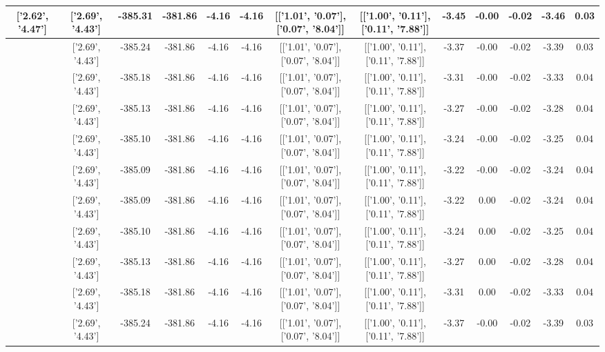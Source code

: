 \begin{table}[htbp]
\begin{adjustbox}{angle=90}
\begin{tabular}{|c|c|c|c|c|c|c|c|c|c|c|c|c|}
 ['2.62', '4.47'] & ['2.69', '4.43'] & -385.31 & -381.86 & -4.16 & -4.16 & [['1.01', '0.07'], ['0.07', '8.04']] & [['1.00', '0.11'], ['0.11', '7.88']] & -3.45 & -0.00 & -0.02 & -3.46 & 0.03\\ \hline
 ['2.63', '4.46'] & ['2.69', '4.43'] & -385.24 & -381.86 & -4.16 & -4.16 & [['1.01', '0.07'], ['0.07', '8.04']] & [['1.00', '0.11'], ['0.11', '7.88']] & -3.37 & -0.00 & -0.02 & -3.39 & 0.03\\ \hline
 ['2.65', '4.46'] & ['2.69', '4.43'] & -385.18 & -381.86 & -4.16 & -4.16 & [['1.01', '0.07'], ['0.07', '8.04']] & [['1.00', '0.11'], ['0.11', '7.88']] & -3.31 & -0.00 & -0.02 & -3.33 & 0.04\\ \hline
 ['2.66', '4.45'] & ['2.69', '4.43'] & -385.13 & -381.86 & -4.16 & -4.16 & [['1.01', '0.07'], ['0.07', '8.04']] & [['1.00', '0.11'], ['0.11', '7.88']] & -3.27 & -0.00 & -0.02 & -3.28 & 0.04\\ \hline
 ['2.67', '4.44'] & ['2.69', '4.43'] & -385.10 & -381.86 & -4.16 & -4.16 & [['1.01', '0.07'], ['0.07', '8.04']] & [['1.00', '0.11'], ['0.11', '7.88']] & -3.24 & -0.00 & -0.02 & -3.25 & 0.04\\ \hline
 ['2.68', '4.44'] & ['2.69', '4.43'] & -385.09 & -381.86 & -4.16 & -4.16 & [['1.01', '0.07'], ['0.07', '8.04']] & [['1.00', '0.11'], ['0.11', '7.88']] & -3.22 & -0.00 & -0.02 & -3.24 & 0.04\\ \hline
 ['2.70', '4.43'] & ['2.69', '4.43'] & -385.09 & -381.86 & -4.16 & -4.16 & [['1.01', '0.07'], ['0.07', '8.04']] & [['1.00', '0.11'], ['0.11', '7.88']] & -3.22 & 0.00 & -0.02 & -3.24 & 0.04\\ \hline
 ['2.71', '4.42'] & ['2.69', '4.43'] & -385.10 & -381.86 & -4.16 & -4.16 & [['1.01', '0.07'], ['0.07', '8.04']] & [['1.00', '0.11'], ['0.11', '7.88']] & -3.24 & 0.00 & -0.02 & -3.25 & 0.04\\ \hline
 ['2.72', '4.42'] & ['2.69', '4.43'] & -385.13 & -381.86 & -4.16 & -4.16 & [['1.01', '0.07'], ['0.07', '8.04']] & [['1.00', '0.11'], ['0.11', '7.88']] & -3.27 & 0.00 & -0.02 & -3.28 & 0.04\\ \hline
 ['2.73', '4.41'] & ['2.69', '4.43'] & -385.18 & -381.86 & -4.16 & -4.16 & [['1.01', '0.07'], ['0.07', '8.04']] & [['1.00', '0.11'], ['0.11', '7.88']] & -3.31 & 0.00 & -0.02 & -3.33 & 0.04\\ \hline
 ['2.75', '4.41'] & ['2.69', '4.43'] & -385.24 & -381.86 & -4.16 & -4.16 & [['1.01', '0.07'], ['0.07', '8.04']] & [['1.00', '0.11'], ['0.11', '7.88']] & -3.37 & -0.00 & -0.02 & -3.39 & 0.03\\ \hline

\end{tabular}
\end{adjustbox}
\end{table}
